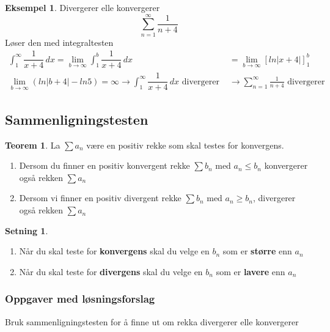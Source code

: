 \documentclass[11pt]{article}
\theoremstyle{definition}
\theoremstyle{definition}
\newtheorem{mitteks}{Eksempel}[section]
\newenvironment{fmitteks}
{\begin{mdframed}[style=minstil]\begin{mitteks}}
		{\end{mitteks}\end{mdframed}}
\theoremstyle{definition}
\newtheorem{minset}{Setning}[section]
\newenvironment{fminset}
{\begin{mdframed}[style=minstil]\begin{minset}}
		{\end{minset}\end{mdframed}}
\theoremstyle{definition}
\newtheorem{teo}{Teorem}[section]
\newenvironment{fteo}
{\begin{mdframed}[style=minstil]\begin{teo}}
		{\end{teo}\end{mdframed}}
\theoremstyle{definition}
\theoremstyle{definition}
\begin{document}
		 \begin{fmitteks}
		 	Divergerer elle konvergerer 
		 	\[\sum_{n=1}^{\infty}\frac{1}{n+4}\]
		 	Løser den med integraltesten
		 	\begin{align*}
		    \int_{1}^{\infty}\dfrac{1}{x+4}\,dx = 
		 	\lim\limits_{b\rightarrow \infty} \int_{1}^{b}\dfrac{1}{x+4}\,dx &=  \lim\limits_{b\rightarrow \infty} \left[ ln|x+4| \right]_{1}^{b}  \\
		    \lim\limits_{b\rightarrow \infty}(ln|b+4|-ln5)=\infty \rightarrow \int_{1}^{\infty}\dfrac{1}{x+4}\,dx \text{ divergerer } &\rightarrow \sum_{n=1}^{\infty}\frac{1}{n+4} \text{ divergerer } 	    
		 	\end{align*}
		 \end{fmitteks}
		 \newpage
		 
		 \subsection{Sammenligningstesten}
		 
		 \begin{fteo}
		 	La \(\sum a_n \) være en positiv rekke som skal testes for konvergens.
		 	\begin{enumerate}
		 		\item Dersom du finner en positiv konvergent rekke \(\sum b_n \) med \(a_n \leq b_n \) konvergerer også rekken \(\sum a_n \)
		 		\item Dersom vi finner en positiv divergent rekke \(\sum b_n \) med \(a_n \geq b_n \), divergerer også rekken \(\sum a_n \)
		 	\end{enumerate}		 \end{fteo}
		 	
		 	\begin{fminset}
		 		\begin{enumerate} \leavevmode
		 		\item Når du skal teste for \textbf{konvergens} skal du velge en \(b_n\) som er \textbf{større} enn \(a_n\)
		 		
		 		\item Når du skal teste for \textbf{divergens} skal du velge en \(b_n\) som er \textbf{lavere} enn \(a_n\)
		 		\end{enumerate}
		 	\end{fminset}
		 
		 \subsubsection{Oppgaver med løsningsforslag}
		 Bruk sammenligningstesten for å finne ut om rekka divergerer elle konvergerer
		 
\end{document}
